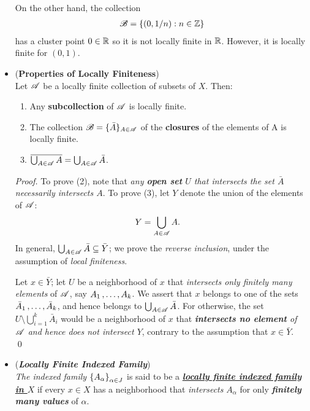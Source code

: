 \documentclass[11pt]{article}
\begin{document}
\begin{itemize}
\begin{example}
On the other hand, the collection
\begin{align*}
{\mathscr B} = \{(0, 1/n): n \in {\mathbb Z}\}
\end{align*} has a cluster point $0\in {\mathbb R}$ so it is not locally finite in ${\mathbb R}$. However, it is locally finite for $(0, 1)$.
\end{example}

\item \begin{lemma} (\textbf{Properties of Locally Finiteness}) \citep{munkres2000topology}\\
Let ${\mathscr A}$ be a locally finite collection of subsets of $X$. Then:
\begin{enumerate}
\item Any \textbf{subcollection} of ${\mathscr A}$ is locally finite.
\item The collection ${\mathscr B} = \{\bar{A}\}_{A \in {\mathscr A}}$ of the \textbf{closures} of the elements of A is locally finite.
\item $\overline{\bigcup_{A \in {\mathscr A}}A} = \bigcup_{A \in {\mathscr A}}\bar{A}$.
\end{enumerate}
\end{lemma}
\begin{proof}
To prove (2), note that \emph{any \textbf{open set} $U$ that intersects the set $\bar{A}$ necessarily intersects $A$}. 
To prove (3), let $Y$ denote the union of the elements of ${\mathscr A}$:
\begin{align*}
Y &= \bigcup_{A \in {\mathscr A}}A.
\end{align*}
In general, $\bigcup_{A \in {\mathscr A}}\bar{A} \subseteq \bar{Y}$; we prove the \emph{reverse inclusion}, under the assumption of \emph{local finiteness}. 

Let $x \in \bar{Y}$; let $U$ be a neighborhood of $x$ that \emph{intersects only finitely many elements} of ${\mathscr A}$, say $A_1 \,{,}\ldots{,}\, A_k$. We assert that $x$ belongs to one of the sets $\bar{A}_1 \,{,}\ldots{,}\, \bar{A}_k$, and hence belongs to $\bigcup_{A \in {\mathscr A}}\bar{A}$. For otherwise, the set $U \setminus \bigcup_{i=1}^{k}\bar{A}_i$ would be a neighborhood of $x$ that \emph{\textbf{intersects no element} of ${\mathscr A}$ and hence does not intersect $Y$}, contrary to the assumption that $x \in \bar{Y}$. \qed 
\end{proof}


\item \begin{definition} (\emph{\textbf{Locally Finite Indexed Family}})\\
\emph{The indexed family} $\left\{A_{\alpha}\right\}_{\alpha \in J}$ is said to be a \underline{\emph{\textbf{locally finite indexed family in $X$}}} if every $x \in X$ has a neighborhood that \emph{intersects} $A_{\alpha}$ for only \emph{\textbf{finitely many values}} of $\alpha$.
\end{definition}


\end{itemize}
\end{document}
